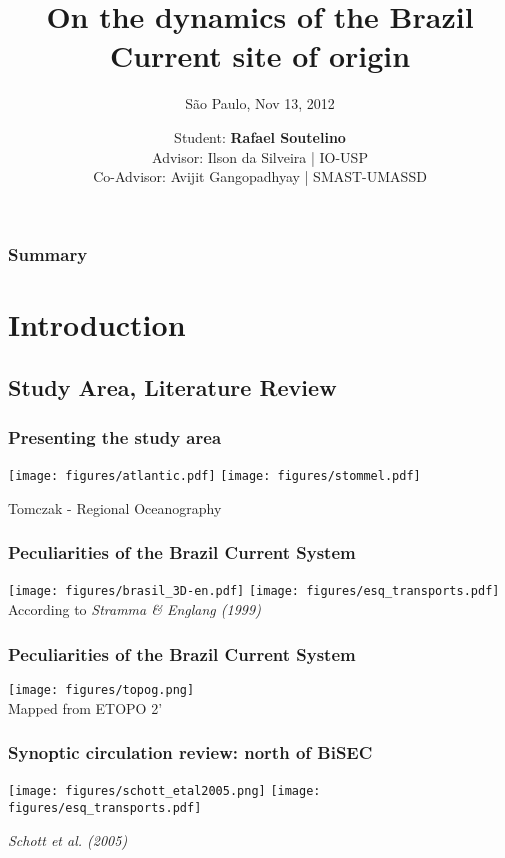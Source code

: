 \documentclass{beamer}
\title{\bf{On the dynamics of the Brazil Current site of origin}}
\subtitle{São Paulo, Nov 13, 2012}
\author[Rafael Soutelino]{Student: {\bf Rafael Soutelino}\\
Advisor: Ilson da Silveira | IO-USP\\
Co-Advisor: Avijit Gangopadhyay | SMAST-UMASSD}
\institute[IOUSP]{
\texttt{[image: lado.png]} 
\texttt{[image: SMASTlogo\_umass\_circle.pdf]} 
}
\date{}
\begin{document}
\begin{frame}
\vspace{1.5cm}
  \titlepage
\end{frame}
\usebackgroundtemplate{}
\begin{frame}
  \frametitle{Summary}
  \tableofcontents
\end{frame}
\section{Introduction}

\subsection{Study Area, Literature Review}
\frame
{
  \frametitle{Presenting the study area}
\texttt{[image: figures/atlantic.pdf]}
\texttt{[image: figures/stommel.pdf]}

\footnotesize{Tomczak - Regional Oceanography}
}

\frame
{
  \frametitle{Peculiarities of the Brazil Current System}
\texttt{[image: figures/brasil\_3D-en.pdf]}\hspace{1cm}
\texttt{[image: figures/esq\_transports.pdf]}\\
\footnotesize{According to {\it Stramma \& Englang (1999)}}
}

\frame
{
  \frametitle{Peculiarities of the Brazil Current System}
\begin{center}
\texttt{[image: figures/topog.png]}\\
\footnotesize{Mapped from ETOPO 2'}
\end{center}
}


\frame
{
  \frametitle{Synoptic circulation review: north of BiSEC}
\texttt{[image: figures/schott\_etal2005.png]}\hspace{1cm}
\texttt{[image: figures/esq\_transports.pdf]}

\footnotesize{\it Schott et al. (2005)}
}
\end{document}
